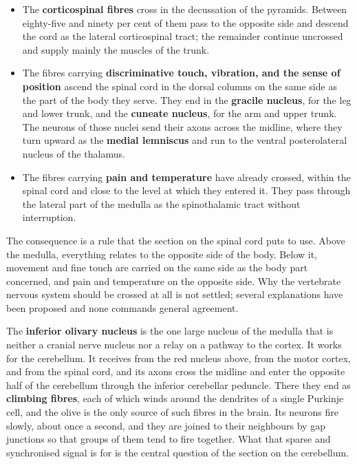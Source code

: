 \documentclass[11pt]{article}
\begin{document}
\begin{itemize}
    \item The \textbf{corticospinal fibres} cross in the decussation of the pyramids. Between eighty-five and ninety per cent of them pass to the opposite side and descend the cord as the lateral corticospinal tract; the remainder continue uncrossed and supply mainly the muscles of the trunk.
    \item The fibres carrying \textbf{discriminative touch, vibration, and the sense of position} ascend the spinal cord in the dorsal columns on the same side as the part of the body they serve. They end in the \textbf{gracile nucleus}, for the leg and lower trunk, and the \textbf{cuneate nucleus}, for the arm and upper trunk. The neurons of those nuclei send their axons across the midline, where they turn upward as the \textbf{medial lemniscus} and run to the ventral posterolateral nucleus of the thalamus.
    \item The fibres carrying \textbf{pain and temperature} have already crossed, within the spinal cord and close to the level at which they entered it. They pass through the lateral part of the medulla as the spinothalamic tract without interruption.
\end{itemize}

The consequence is a rule that the section on the spinal cord puts to use. Above the medulla, everything relates to the opposite side of the body. Below it, movement and fine touch are carried on the same side as the body part concerned, and pain and temperature on the opposite side. Why the vertebrate nervous system should be crossed at all is not settled; several explanations have been proposed and none commands general agreement.

The \textbf{inferior olivary nucleus} is the one large nucleus of the medulla that is neither a cranial nerve nucleus nor a relay on a pathway to the cortex. It works for the cerebellum. It receives from the red nucleus above, from the motor cortex, and from the spinal cord, and its axons cross the midline and enter the opposite half of the cerebellum through the inferior cerebellar peduncle. There they end as \textbf{climbing fibres}, each of which winds around the dendrites of a single Purkinje cell, and the olive is the only source of such fibres in the brain. Its neurons fire slowly, about once a second, and they are joined to their neighbours by gap junctions so that groups of them tend to fire together. What that sparse and synchronised signal is for is the central question of the section on the cerebellum.
\end{document}
